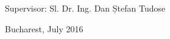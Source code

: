 \vfill\vfill\vfill
\begin{center}
	\Large
	Supervisor: Sl. Dr. Ing. Dan Ștefan Tudose\\
\end{center}

\vfill
\begin{center}
	\large
	Bucharest, July 2016
\end{center}

\cleardoublepage


\pagestyle{headings}
\tableofcontents

